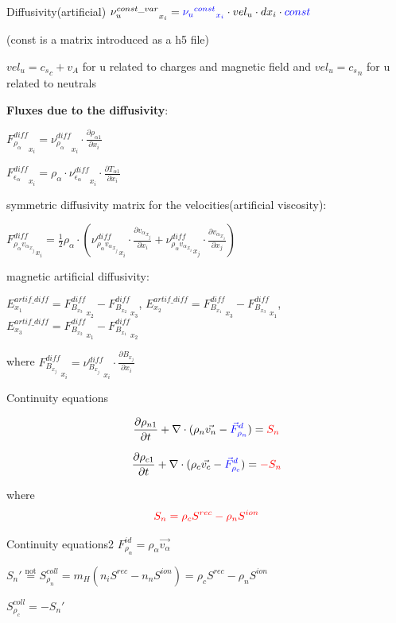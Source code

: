 \documentclass{beamer}
\begin{document}
\begin{frame}{Diffusivity(artificial)}
${\nu_u^{const\_var}}_{x_i}  = \textcolor{blue}{{{\nu_u}^{const}}_{x_i}} \cdot  vel_u \cdot  dx_i \cdot  \textcolor{blue}{const}$ 

(const is a matrix introduced as a h5 file)

$vel_u =  {c_s}_c + v_A$ for u  related to charges and magnetic field and 
$vel_u =  {c_s}_n $ for u  related to neutrals

\textbf{Fluxes due to the diffusivity}:

${F_{\rho_\alpha}^{diff}}_{x_i} =  {\nu_{\rho_\alpha}^{diff}}_{x_i} \cdot \frac{\partial \rho_{\alpha1}}{\partial x_i}$

${F_{\epsilon_\alpha}^{diff}}_{x_i} =  \rho_\alpha \cdot {\nu_{\epsilon_\alpha}^{diff}}_{x_i} \cdot \frac{\partial T_{\alpha1}}{\partial x_i}$


symmetric diffusivity matrix for the velocities(artificial viscosity):

${F_{\rho_\alpha{v_\alpha}_{x_j}}^{diff}}_{x_i}  = \frac{1}{2} \rho_\alpha \cdot ({\nu_{\rho_\alpha{v_\alpha}_{x_j}}^{diff}}_{x_i} \cdot \frac{\partial {v_\alpha}_{x_j}}{\partial x_i} +  {\nu_{\rho_\alpha{v_\alpha}_{x_i}}^{diff}}_{x_j} \cdot \frac{\partial {v_\alpha}_{x_i}}{\partial x_j} )$

magnetic artificial diffusivity:

$E^{artif\_diff}_{x_1} = {F_{B_{x_3}}^{diff}}_{x_2} - {F_{B_{x_2}}^{diff}}_{x_3}   $,  
$E^{artif\_diff}_{x_2} = {F_{B_{x_1}}^{diff}}_{x_3} - {F_{B_{x_3}}^{diff}}_{x_1}   $,  
$E^{artif\_diff}_{x_3} = {F_{B_{x_2}}^{diff}}_{x_1} - {F_{B_{x_1}}^{diff}}_{x_2}   $  

where 
${F_{B_{x_j}}^{diff}}_{x_i} =  {\nu_{B_{x_j}}^{diff}}_{x_i} \cdot \frac{\partial B_{x_j}}{\partial x_i}$

\end{frame}
\begin{frame}{Continuity equations}
\begin{small}
 \[ \frac{\partial \rho_{n1}}{\partial t} + \nabla \cdot (\rho_n \vec{v_n} - {\color{blue} \vec{F}^d_{\rho_n} } )= {\color{red}  S_n }  \]

 \[ \frac{\partial \rho_{c1}}{\partial t} + \nabla \cdot (\rho_c \vec{v_c} - {\color{blue} \vec{F}^d_{\rho_c}  } )= {\color{red}  -S_n }  \]
\end{small}
where
\[{\color{red} S_n = \rho_c S^{rec} - \rho_n S^{ion} }  \]
\end{frame}
\begin{frame}{Continuity equations2}
$F_{\rho_{\alpha}}^{id} = \rho_\alpha \vec{v_\alpha} $

$S_n' \stackrel{\text{not}}{=} S_{\rho_n}^{coll} = m_H (n_i S^{rec} - n_n S^{ion} ) = \rho_c S^{rec} - \rho_n S^{ion} $

$S_{\rho_c}^{coll} = -S_n'$
\end{frame}
\end{document}
